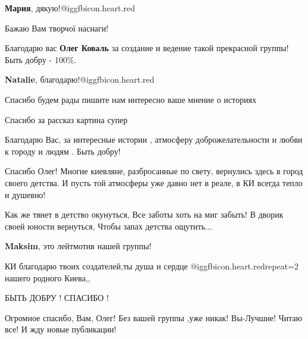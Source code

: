 \begin{itemize}
\begin{itemize} %
\textbf{Мария}, дякую!@igg{fbicon.heart.red}
\end{itemize} %

Бажаю Вам творчої наснаги!

Благодарю вас \textbf{Олег Коваль} за создание и ведение такой прекрасной группы!
Быть добру - 100\%.

\begin{itemize} %
\textbf{Natalie}, благодарю!@igg{fbicon.heart.red}
\end{itemize} %

Спасибо будем рады пишите нам интересно ваше мнение о историях

Спасибо за рассказ картина супер

Благодарю Вас, за интересные истории , атмосферу доброжелательности и любви к городу и людям .
Быть добру!


Спасибо Олег! Многие киевляне, разбросанные по свету, вернулись здесь в город
своего детства. И пусть той атмосферы уже давно нет в реале, в КИ всегда тепло
и душевно!



\obeycr
Как же тянет в детство окунуться,
Все заботы хоть на миг забыть!
В дворик своей юности вернуться,
Чтобы запах детства ощутить...
\restorecr

\begin{itemize} %
\textbf{Maksim}, это лейтмотив нашей группы!
\end{itemize} %

КИ благодарю твоих создателей,ты душа и сердце @igg{fbicon.heart.red}{repeat=2}
нашего родного Киева,,

 БЫТЬ ДОБРУ !  СПАСИБО !

 Огромное спасибо, Вам, Олег! Без вашей группы ,уже
никак! Вы-Лучшие! Читаю все! И жду новые публикации!
\end{itemize} %
